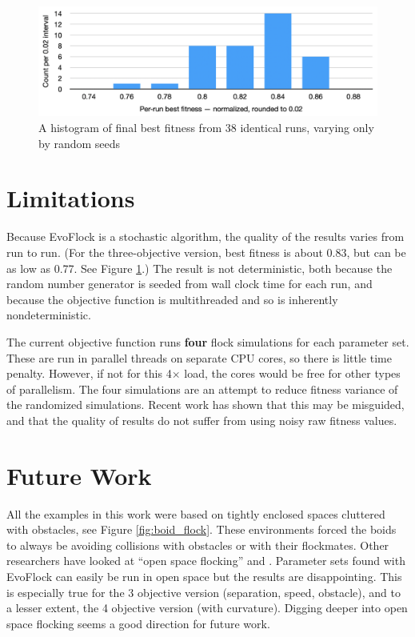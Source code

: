 \documentclass[letterpaper]{article}
\begin{document}
\begin{figure}[]
    \centering
    \includegraphics[width=0.9\linewidth]{images/temp_seed_variance.png}
    \caption{A histogram of final best fitness from 38 identical runs, varying only by random seeds}
    \label{fig:seed_variance}
\end{figure}


\section{Limitations}
\label{sec:limitations}

Because EvoFlock is a stochastic algorithm, the quality of the results varies from run to run. (For the three-objective version, best fitness is about 0.83, but can be as low as 0.77. See Figure \ref{fig:seed_variance}.) The result is not deterministic, both because the random number generator is seeded from wall clock time for each run, and because the objective function is multithreaded and so is inherently nondeterministic.

The current objective function runs \textbf{four} flock simulations for each parameter set. These are run in parallel threads on separate CPU cores, so there is little time penalty. However, if not for this 4{$\times$} load, the cores would be free for other types of parallelism. The four simulations are an attempt to reduce fitness variance of the randomized simulations. Recent work \citep{antipov_evolutionary_2025} has shown that this may be misguided, and that the quality of results do not suffer from using noisy raw fitness values.

\section{Future Work}
\label{sec:future}

All the examples in this work were based on tightly enclosed spaces cluttered with obstacles, see Figure \ref{fig:boid_flock}. These environments forced the boids to always be avoiding collisions with obstacles or with their flockmates. Other researchers have looked at ``open space flocking'' \citep{hoetzlein_flock2_2024} and \citep{brambati_learning_2025}. Parameter sets found with EvoFlock can easily be run in open space but the results are disappointing. This is especially true for the 3 objective version (separation, speed, obstacle), and to a lesser extent, the 4 objective version (with curvature). Digging deeper into open space flocking seems a good direction for future work.
\end{document}
